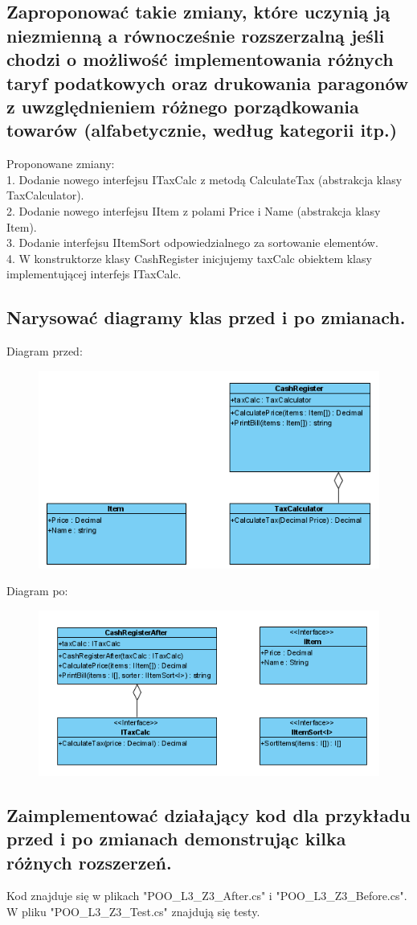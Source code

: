 \documentclass[10pt, a4paper]{article}
\begin{document}
\subsection*{Zaproponować takie zmiany, które uczynią ją niezmienną a równocześnie rozszerzalną jeśli chodzi o możliwość implementowania różnych taryf podatkowych oraz drukowania paragonów z uwzględnieniem różnego porządkowania towarów (alfabetycznie, według kategorii itp.)}
Proponowane zmiany: \\
1. Dodanie nowego interfejsu ITaxCalc z metodą CalculateTax (abstrakcja klasy TaxCalculator). \\
2. Dodanie nowego interfejsu IItem z polami Price i Name (abstrakcja klasy Item). \\
3. Dodanie interfejsu IItemSort odpowiedzialnego za sortowanie elementów. \\
4. W konstruktorze klasy CashRegister inicjujemy taxCalc obiektem klasy implementującej interfejs ITaxCalc.
\subsection*{Narysować diagramy klas przed i po zmianach.}
Diagram przed:
\begin{figure}[H]
\includegraphics{Diagram_before}
\end{figure}
Diagram po:
\begin{figure}[H]
\includegraphics{Diagram_after}
\end{figure}
\subsection*{Zaimplementować działający kod dla przykładu przed i po zmianach demonstrując kilka różnych rozszerzeń.}
Kod znajduje się w plikach "POO\_L3\_Z3\_After.cs" i "POO\_L3\_Z3\_Before.cs". W pliku "POO\_L3\_Z3\_Test.cs" znajdują się testy.
\end{document}
